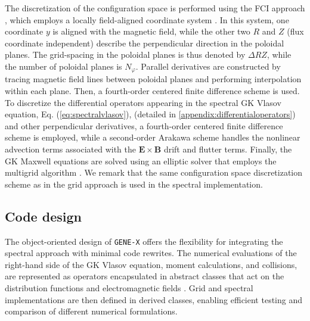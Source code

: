 \documentclass[preprint,12pt]{elsarticle}
\begin{document}
The discretization of the configuration space is performed using the FCI approach \cite{hariri2013,stegmeir2016}, which employs a locally field-aligned coordinate system \cite{michels2021}. In this system, one coordinate $y$ is aligned with the magnetic field, while the other two $R$ and $Z$ (flux coordinate independent) describe the perpendicular direction in the poloidal planes. The grid-spacing in the poloidal planes is thus denoted by $\Delta RZ$, while the number of poloidal planes is $N_{\varphi}$. Parallel derivatives are constructed by tracing magnetic field lines between poloidal planes and performing interpolation within each plane. Then, a fourth-order centered finite difference scheme is used. To discretize the differential operators appearing in the spectral GK Vlasov equation, Eq. (\ref{eq:spectralvlasov}), (detailed in \ref{appendix:differentialoperators}) and other perpendicular derivatives, a fourth-order centered finite difference scheme is employed, while a second-order Arakawa scheme \cite{arakawa1997} handles the nonlinear advection terms associated with the $\bm E \times \bm B$ drift and flutter terms. Finally, the GK Maxwell equations are solved using an elliptic solver that employs the multigrid algorithm \cite{stegmeir2023,ulbl2023}. We remark that the same configuration space discretization scheme as in the grid approach is used in the spectral implementation. 

\subsection{Code design}
\label{subsec:codedesign}

The object-oriented design of \verb|GENE-X| offers the flexibility for integrating the spectral approach with minimal code rewrites. The numerical evaluations of the right-hand side of the GK Vlasov equation, moment calculations, and collisions, are represented as operators encapsulated in abstract classes that act on the distribution functions and electromagnetic fields \cite{michelsphd2021}. Grid and spectral implementations are then defined in derived classes, enabling efficient testing and comparison of different numerical formulations.
\end{document}
